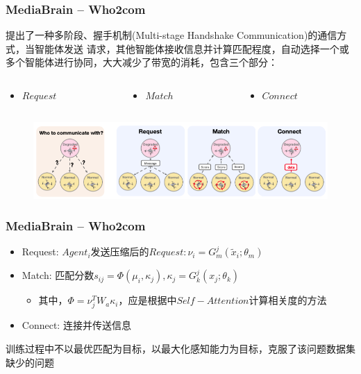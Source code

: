 \documentclass[8]{beamer}
\begin{document}
\begin{frame}
    \frametitle{MediaBrain -- Who2com\cite{liu2020who2com}}
    \cite{liu2020who2com}提出了一种多阶段、握手机制(Multi-stage Handshake Communication)的通信方式，当智能体发送
    请求，其他智能体接收信息并计算匹配程度，自动选择一个或多个智能体进行协同，大大减少了带宽的消耗，包含三个部分：
    \begin{columns}
        \begin{column}{0.3\linewidth}
            \begin{itemize}
                \item $Request$
            \end{itemize}
        \end{column}

        \begin{column}{0.3\linewidth}
            \begin{itemize}
                \item $Match$
            \end{itemize}
        \end{column}

        \begin{column}{0.3\linewidth}
            \begin{itemize}
                \item $Connect$
            \end{itemize}
        \end{column}
    \end{columns}
    \begin{figure}
        \includegraphics[width=\linewidth]{pic/Who2com.png}
    \end{figure}

\end{frame}

\begin{frame}
    \frametitle{MediaBrain -- Who2com\cite{liu2020who2com}}
    \begin{itemize}
        \item Request: $Agent_i$发送压缩后的$Request: \nu_i = G^j_m(\widetilde{x} _i;\theta_m)$
        \item Match: 匹配分数$s_{ij}=\Phi(\mu_i,\kappa_j), \kappa_j = G_k^j (x_j;\theta_k)$
        \begin{itemize}
            \item 其中，$\Phi = \nu_j^T W_a \kappa_i$，应是根据\cite{transformer}中$Self-Attention$计算相关度的方法
        \end{itemize}
        \item Connect: 连接并传送信息
    \end{itemize}
    \bigskip
    \bigskip
    训练过程中不以最优匹配为目标，以最大化感知能力为目标，克服了该问题数据集缺少的问题
\end{frame}
\end{document}
